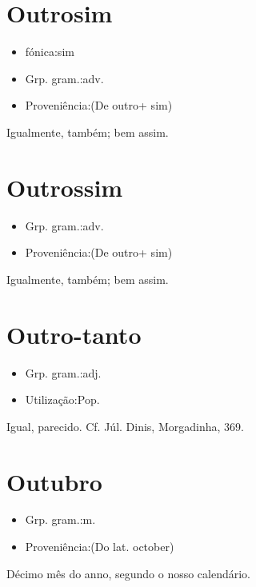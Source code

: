 \section{Outrosim}
\begin{itemize}
\item {fónica:sim}
\end{itemize}
\begin{itemize}
\item {Grp. gram.:adv.}
\end{itemize}
\begin{itemize}
\item {Proveniência:(De \textunderscore outro\textunderscore  + \textunderscore sim\textunderscore )}
\end{itemize}
Igualmente, também; bem assim.
\section{Outrossim}
\begin{itemize}
\item {Grp. gram.:adv.}
\end{itemize}
\begin{itemize}
\item {Proveniência:(De \textunderscore outro\textunderscore  + \textunderscore sim\textunderscore )}
\end{itemize}
Igualmente, também; bem assim.
\section{Outro-tanto}
\begin{itemize}
\item {Grp. gram.:adj.}
\end{itemize}
\begin{itemize}
\item {Utilização:Pop.}
\end{itemize}
Igual, parecido. Cf. Júl. Dinis, \textunderscore Morgadinha\textunderscore , 369.
\section{Outubro}
\begin{itemize}
\item {Grp. gram.:m.}
\end{itemize}
\begin{itemize}
\item {Proveniência:(Do lat. \textunderscore october\textunderscore )}
\end{itemize}
Décimo mês do anno, segundo o nosso calendário.
